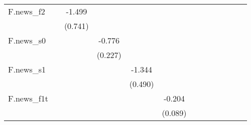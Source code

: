 {\begin{tabular}{l*{12}{c}}
\addlinespace
F.news\_f2   &                     &      -1.499\sym{*}  &                     &                     &                     &                     &                     &                     &                     &                     &                     &                     \\
            &                     &     (0.741)         &                     &                     &                     &                     &                     &                     &                     &                     &                     &                     \\
\addlinespace
F.news\_s0   &                     &                     &      -0.776\sym{***}&                     &                     &                     &                     &                     &                     &                     &                     &                     \\
            &                     &                     &     (0.227)         &                     &                     &                     &                     &                     &                     &                     &                     &                     \\
\addlinespace
F.news\_s1   &                     &                     &                     &      -1.344\sym{**} &                     &                     &                     &                     &                     &                     &                     &                     \\
            &                     &                     &                     &     (0.490)         &                     &                     &                     &                     &                     &                     &                     &                     \\
\addlinespace
F.news\_f1t  &                     &                     &                     &                     &      -0.204\sym{**} &                     &                     &                     &                     &                     &                     &                     \\
            &                     &                     &                     &                     &     (0.089)         &                     &                     &                     &                     &                     &                     &                     \\

\end{tabular}}
